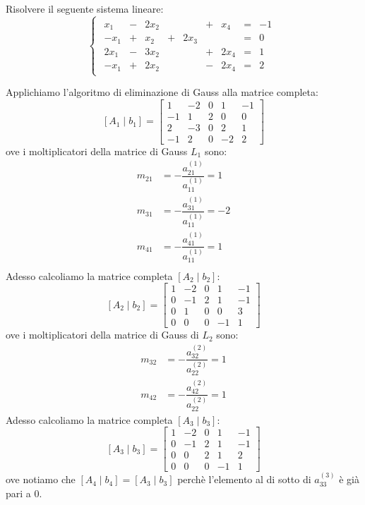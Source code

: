 \documentclass[12pt]{report}
\newcounter{exercise}
\begin{document}
\begin{exercise}{}{}
\begin{assignment}{}{}
Risolvere  il seguente sistema lineare:
\[
\begin{cases}
\begin{array}{rcrcrcrcr}
  x_1 & - & 2x_2 &   &      & + &  x_4 & = & -1 \\
 -x_1 & + &  x_2 & + & 2x_3 &   &      & = &  0 \\
 2x_1 & - & 3x_2 &   &      & + & 2x_4 & = &  1 \\
 -x_1 & + & 2x_2 &   &      & - & 2x_4 & = &  2
\end{array}
\end{cases}
\]
\end{assignment}
Applichiamo l'algoritmo di eliminazione di Gauss alla matrice completa:
\[
[A_1 \mid b_1] = \left[
\begin{array}{cccc|r}
  1 & -2 & 0 &  1 & -1 \\
 -1 &  1 & 2 &  0 &  0 \\
  2 & -3 & 0 &  2 &  1 \\
 -1 &  2 & 0 & -2 &  2
\end{array}
\right]
\]
ove i moltiplicatori della matrice di Gauss $L_1$ sono:
\begin{align*}
	m_{21} &= -\dfrac{a^{(1)}_{21}}{a^{(1)}_{11}} = 1 \\
	m_{31} &= -\dfrac{a^{(1)}_{31}}{a^{(1)}_{11}} = -2 \\
	m_{41} &= -\dfrac{a^{(1)}_{41}}{a^{(1)}_{11}} = 1 \\
\end{align*}
Adesso calcoliamo la matrice completa $[A_2 \mid b_2]$:
\[
[A_2 \mid b_2] = \left[
\begin{array}{cccc|r}
  1 & -2 & 0 &  1 & -1 \\
  0 & -1 & 2 &  1 & -1 \\
  0 & 1 & 0 &  0 &  3 \\
 	0 & 0 & 0 & -1 &  1
\end{array}
\right]
\]
ove i moltiplicatori della matrice di Gauss di $L_2$ sono:
\begin{align*}
	m_{32} &= -\dfrac{a^{(2)}_{32}}{a^{(2)}_{22}} = 1 \\
	m_{42} &= -\dfrac{a^{(2)}_{42}}{a^{(2)}_{22}} = 1
\end{align*}
Adesso calcoliamo la matrice completa $[A_3 \mid b_3]$:
\[
[A_3 \mid b_3] = \left[
\begin{array}{cccc|r}
  1 & -2 & 0 &  1 & -1 \\
  0 & -1 & 2 &  1 & -1 \\
  0 & 0 & 2 &  1 &  2 \\
 	0 & 0 & 0 & -1 &  1
\end{array}
\right]
\]
ove notiamo che $[A_4 \mid b_4] = [A_3 \mid b_3]$ perchè l'elemento al di sotto di $a^{(3)}_{33}$ è già pari a 0.


\end{exercise}
\end{document}
